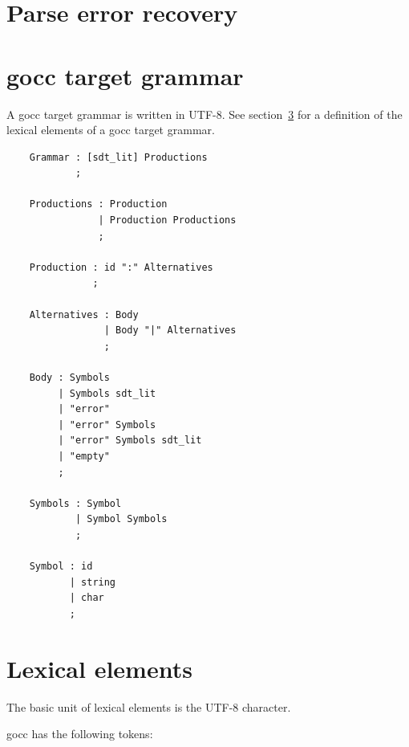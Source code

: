\documentclass[12pt]{article}
\begin{document}
\section{Parse error recovery} \label{sec:error recovery}
\TBD

\appendix
\section{gocc target grammar}
	A gocc target grammar is written in UTF-8. See section~\ref{sec:lexical elements} for a definition of the lexical elements of a gocc target grammar. 

	\begin{verbatim}
	Grammar : [sdt_lit] Productions 
	        ;

	Productions : Production					
	            | Production Productions			
	            ;

	Production : id ":" Alternatives		
	           ;

	Alternatives : Body					
	             | Body "|" Alternatives	
	             ; 

	Body : Symbols					
	     | Symbols sdt_lit			
	     | "error"
	     | "error" Symbols
	     | "error" Symbols sdt_lit
	     | "empty"
	     ;

	Symbols	: Symbol					
	        | Symbol Symbols			
	        ;

	Symbol : id							
	       | string						
	       | char	
	       ;
	\end{verbatim}

\section{Lexical elements} \label{sec:lexical elements}
	The basic unit of lexical elements is the UTF-8 character.

	gocc has the following tokens:
\end{document}
